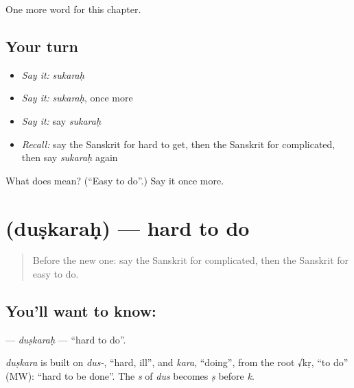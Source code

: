 \begin{grammarlens}[title={What you've built}]
One more word for this chapter.
\end{grammarlens}

\subsection*{Your turn}
\begin{itemize}
\raggedright
  \item \emph{Say it:} \emph{sukaraḥ}
  \item \emph{Say it:} \emph{sukaraḥ}, once more
  \item \emph{Say it:} say \emph{sukaraḥ}
  \item \emph{Recall:} say the Sanskrit for hard to get, then the Sanskrit for complicated, then say \emph{sukaraḥ} again
\end{itemize}

\begin{tcolorbox}[breakable,colback=teal!4,colframe=teal!35!black,title={Before you move on}]
What does  mean? (\textquotedblleft{}Easy to do\textquotedblright{}.) Say it once more.
\end{tcolorbox}
\section[\texorpdfstring{\sk{दुष्करः} (duṣkaraḥ)}{दुष्करः (duṣkaraḥ)}]{ (duṣkaraḥ) — hard to do}

\label{lesson:SA-C242-duskarah}



\begin{quote}
Before the new one: say the Sanskrit for complicated, then the Sanskrit for easy to do.
\end{quote}

\subsection*{You'll want to know: }
\textbf{} — \emph{duṣkaraḥ} — \textquotedblleft{}hard to do\textquotedblright{}.

\begin{cousinweb}
\emph{duṣkara} is built on \emph{dus-}, \textquotedblleft{}hard, ill\textquotedblright{}, and \emph{kara}, \textquotedblleft{}doing\textquotedblright{}, from the root √kṛ, \textquotedblleft{}to do\textquotedblright{} (MW): \textquotedblleft{}hard to be done\textquotedblright{}. The \emph{s} of \emph{dus} becomes \emph{ṣ} before \emph{k}.
\end{cousinweb}

